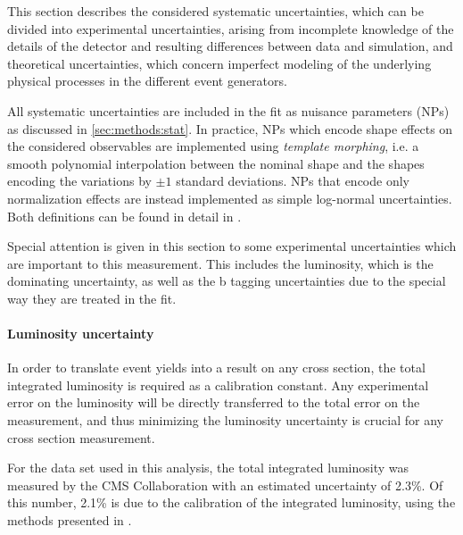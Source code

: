 This section describes the considered systematic uncertainties, which can be divided into experimental uncertainties, arising from incomplete knowledge of the details of the detector and resulting differences between data and simulation, and theoretical uncertainties, which concern imperfect modeling of the underlying physical processes in the different event generators. %

All systematic uncertainties are included in the fit as nuisance parameters (NPs) as discussed in \cref{sec:methods:stat}. In practice, NPs which encode shape effects on the considered observables are implemented using \textit{template morphing}, i.e. a smooth polynomial interpolation between the nominal shape and the shapes encoding the variations by $\pm 1$ standard deviations. NPs that encode only normalization effects are instead implemented as simple log-normal uncertainties. Both definitions can be found in detail in .

Special attention is given in this section to some experimental uncertainties which are important to this measurement. This includes the luminosity, which is the dominating uncertainty, as well as 
the b tagging uncertainties due to the special way they are treated in the fit.

\paragraph{Luminosity uncertainty}

In order to translate event yields into a result on any cross section, the total integrated luminosity is required as a calibration constant. Any experimental error on the luminosity will be directly transferred to the total error on the measurement, and thus minimizing the luminosity uncertainty is crucial for any cross section measurement.

For the data set used in this analysis, the total integrated luminosity was measured by the CMS Collaboration with an estimated uncertainty of 2.3\%. Of this number, 2.1\% is due to the calibration of the integrated luminosity, using the methods presented in .%

